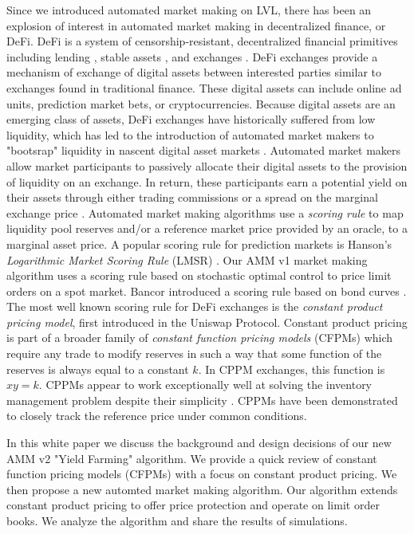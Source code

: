 \documentclass{article}
\begin{document}
Since we introduced automated market making on LVL, there has been an explosion of interest in automated market making in decentralized finance, or DeFi. DeFi is a system of censorship-resistant, decentralized financial primitives including lending \cite{compound}, stable assets \cite{dai}, and exchanges \cite{uniswapv2}. DeFi exchanges provide a mechanism of exchange of digital assets between interested parties similar to exchanges found in traditional finance. These digital assets can include online ad units, prediction market bets, or cryptocurrencies. Because digital assets are an emerging class of assets, DeFi exchanges have historically suffered from low liquidity, which has led to the introduction of automated market makers to "bootsrap" liquidity in nascent digital asset markets \cite{practical}. Automated market makers allow market participants to passively allocate their digital assets to the provision of liquidity on an exchange. In return, these participants earn a potential yield on their assets through either trading commissions or a spread on the marginal exchange price \cite{yfintro}. Automated market making algorithms use a \emph{scoring rule} to map liquidity pool reserves and/or a reference market price provided by an oracle, to a marginal asset price. A popular scoring rule for prediction markets is Hanson's \emph{Logarithmic Market Scoring Rule} (LMSR) \cite{hanson}. Our AMM v1 market making algorithm uses a scoring rule based on stochastic optimal control to price limit orders on a spot market. Bancor introduced a scoring rule based on bond curves \cite{bancor}. The most well known scoring rule for DeFi exchanges is the \emph{constant product pricing model}, first introduced in the Uniswap Protocol. Constant product pricing is part of a broader family of \emph{constant function pricing models} (CFPMs) which require any trade to modify reserves in such a way that some function of the reserves is always equal to a constant $k$. In CPPM exchanges, this function is $xy = k$. CPPMs appear to work exceptionally well at solving the inventory management problem despite their simplicity \cite{stanford}. CPPMs have been demonstrated to closely track the reference price under common conditions.

In this white paper we discuss the background and design decisions of our new AMM v2 "Yield Farming" algorithm. We provide a quick review of constant function pricing models (CFPMs) with a focus on constant product pricing. We then propose a new automted market making algorithm. Our algorithm extends constant product pricing to offer price protection and operate on limit order books. We analyze the algorithm and share the results of simulations.
\end{document}
